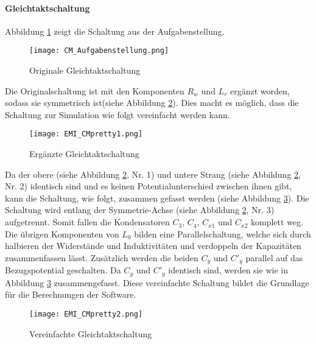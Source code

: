 \paragraph{Gleichtaktschaltung}\label{para:zusammenfassungGleichtakt}
Abbildung \ref{fig:CMSchaltungOriginal} zeigt die Schaltung aus der Aufgabenstellung. 
\begin{figure}[H]
	\centering
	\texttt{[image: CM\_Aufgabenstellung.png]}
	\caption{Originale Gleichtaktschaltung\cite{aufgabenstellung}}
	\label{fig:CMSchaltungOriginal}
\end{figure}
Die Originalschaltung ist mit den Komponenten $R_w$ und $L_r$ ergänzt worden, sodass sie symmetrisch ist(siehe Abbildung \ref{fig:CMSchaltungErgänzt}). Dies macht es möglich, dass die Schaltung zur Simulation wie folgt vereinfacht werden kann.
\begin{figure}[H]
	\centering
	\texttt{[image: EMI\_CMpretty1.png]}
	\caption{Ergänzte Gleichtaktschaltung}
	\label{fig:CMSchaltungErgänzt}
\end{figure}
Da der obere (siehe Abbildung \ref{fig:CMSchaltungErgänzt}, Nr. 1) und untere Strang (siehe Abbildung \ref{fig:CMSchaltungErgänzt}, Nr. 2) identisch sind und es keinen Potentialunterschied zwischen ihnen gibt, kann die Schaltung, wie folgt, zusammen gefasst werden (siehe Abbildung \ref{fig:CMSchaltungvereinfacht}). Die Schaltung wird entlang der Symmetrie-Achse (siehe Abbildung \ref{fig:CMSchaltungErgänzt}, Nr. 3) aufgetrennt. Somit fallen die Kondensatoren $C_3$, $C_4$, $C_{x1}$ und $C_{x2}$ komplett weg. Die übrigen Komponenten von $L_0$ bilden eine Parallelschaltung, welche sich durch halbieren der Widerstände und Induktivitäten und verdoppeln der Kapazitäten zusammenfassen lässt. Zusätzlich werden die beiden $C_y$ und $C'_{y}$ parallel auf das Bezugspotential geschalten. Da $C_y$ und $C'_y$ identisch sind, werden sie wie in Abbildung \ref{fig:CMSchaltungvereinfacht} zusammengefasst. Diese vereinfachte Schaltung bildet die Grundlage für die Berechnungen der Software.
\begin{figure}[H]
	\centering
	\texttt{[image: EMI\_CMpretty2.png]}
	\caption{Vereinfachte Gleichtaktschaltung}
	\label{fig:CMSchaltungvereinfacht}
\end{figure}

